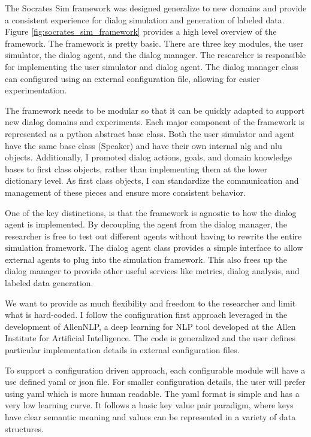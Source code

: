 The Socrates Sim framework was designed generalize to new domains and provide a consistent experience for dialog simulation and generation of labeled data. Figure \ref{fig:socrates_sim_framework} provides a high level overview of the framework. The framework is pretty basic. There are three key modules, the user simulator, the dialog agent, and the dialog manager. The researcher is responsible for implementing the user simulator and dialog agent. The dialog manager class can configured using an external configuration file, allowing for easier experimentation.

The framework needs to be modular so that it can be quickly adapted to support new dialog domains and experiments. Each major component of the framework is represented as a python abstract base class. Both the user simulator and agent have the same base class (Speaker) and have their own internal nlg and nlu objects. Additionally, I promoted dialog actions, goals, and domain knowledge bases to first class objects, rather than implementing them at the lower dictionary level. As first class objects, I can standardize the communication and management of these pieces and ensure more consistent behavior.

One of the key distinctions, is that the framework is agnostic to how the dialog agent is implemented. By decoupling the agent from the dialog manager, the researcher is free to test out different agents without having to rewrite the entire simulation framework.  The dialog agent class provides a simple interface to allow external agents to plug into the simulation framework. This also frees up the dialog manager to provide other useful services like metrics, dialog analysis, and labeled data generation. 

We want to provide as much flexibility and freedom to the researcher and limit what is hard-coded. I follow the configuration first approach leveraged in the development of AllenNLP, a deep learning for NLP tool developed at the Allen Institute for Artificial Intelligence. The code is generalized and the user defines particular implementation details in external configuration files. 

To support a configuration driven approach, each configurable module will have a use defined yaml or json file. For smaller configuration details, the user will prefer using yaml which is more human readable. The yaml format is simple and has a very low learning curve. It follows a basic key value pair paradigm, where keys have clear semantic meaning and values can be represented in a variety of data structures. 


